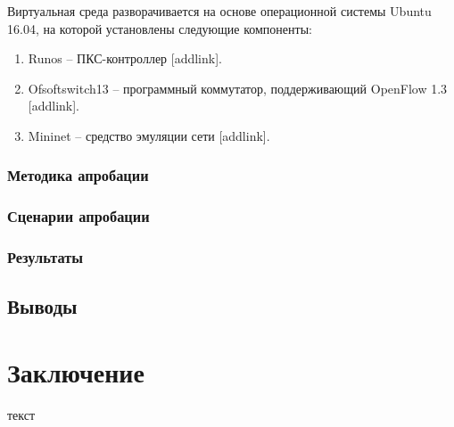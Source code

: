 \documentclass[12pt,fleqn]{article}
\begin{document}
Виртуальная среда разворачивается на основе операционной системы Ubuntu 16.04,
на которой установлены следующие компоненты:
\begin{enumerate}
	\item Runos -- ПКС-контроллер [addlink].
	\item Ofsoftswitch13 -- программный коммутатор, поддерживающий OpenFlow 1.3 [addlink].
	\item Mininet -- средство эмуляции сети [addlink].
\end{enumerate}

\subsubsection{Методика апробации}
\subsubsection{Сценарии апробации}
\subsubsection{Результаты}
\subsection{Выводы}


\section*{Заключение}
текст

\renewcommand{\bibname}{Список литературы}
\end{document}

